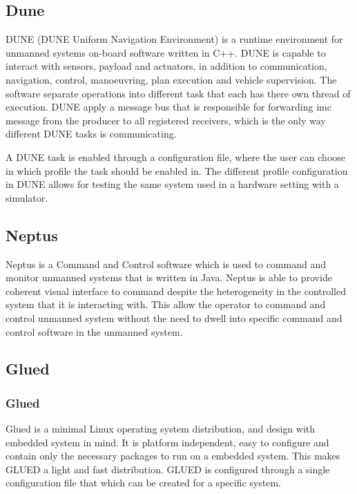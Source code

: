 \subsection{Dune}
DUNE (DUNE Uniform Navigation Environment) is a runtime environment for unmanned systems on-board software written in C++. DUNE is capable to interact with sensors, payload and actuators, in addition to communication, navigation, control, manoeuvring, plan execution and vehicle supervision. The software separate operations into different task that each has there own thread of execution. DUNE apply a message bus that is responsible for forwarding \gls{imc} message from the producer to all registered receivers, which is the only way different DUNE tasks is communicating. 

A DUNE task is enabled through a configuration file, where the user can choose in which profile the task should be enabled in. The different profile configuration in DUNE allows for testing the same system used in a hardware setting with a simulator.
\subsection{Neptus}
Neptus is a Command and Control software which is used to command and monitor unmanned systems that is written in Java. Neptus is able to provide coherent visual interface to command despite the heterogeneity in the controlled system that it is interacting with.  This allow the operator to command and control unmanned system without the need to dwell into specific command and control software in the unmanned system.


\subsection{Glued}

\subsubsection{Glued}
Glued is a minimal Linux operating system distribution, and design with embedded system in mind. It is platform independent, easy to configure and contain only the necessary packages to run on a embedded system. This makes GLUED a light and fast distribution. GLUED is configured through a single configuration file that which can be created for a specific system.
